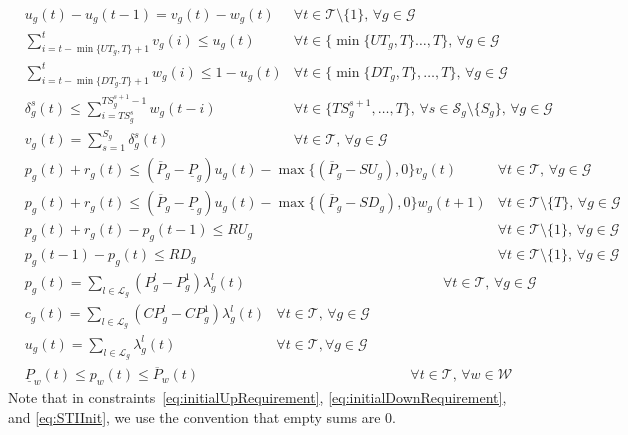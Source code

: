 \documentclass{article}
\newcommand{\cT}{{\mathcal T}}
\newcommand{\cS}{{\mathcal S}}
\newcommand{\cG}{{\mathcal G}}
\newcommand{\cL}{{\mathcal L}}
\newcommand{\cW}{{\mathcal W}}
\newcommand{\uP}{\underline{P}}
\newcommand{\oP}{\overline{P}}
\begin{document}
{\begin{align}
		& u_g(t) - u_g(t-1) = v_g(t) - w_g(t) & \forall t \in \cT\setminus\{1\}, \, \forall g \in \cG \label{eq:Logical} \\
		& \sum_{i= t-\min\{UT_g,T\} + 1}^t v_g(i) \leq u_g(t) & \forall t \in \{\min\{UT_g,T\} \ldots, T\}, \, \forall g \in \cG \label{eq:Startup} \\
		& \sum_{i= t-\min\{DT_g.T\} + 1}^t w_g(i) \leq 1 - u_g(t) & \forall t \in \{\min\{DT_g, T\}, \ldots, T\}, \, \forall g \in \cG \label{eq:Shutdown} \\
		& \delta^s_g(t) \leq \sum_{i = TS^s_g}^{TS^{s+1}_g-1} w_g(t-i) & \forall t \in \{TS^{s+1}_g,\ldots,T\},\,\forall s \in \cS_g\!\setminus\!\{S_g\},\,  \forall g \in \cG \label{eq:STISelect} \\
		& v_g(t) = \sum_{s = 1}^{S_g} \delta^s_g(t) & \forall t \in \cT,\, \forall g \in \cG \label{eq:STILink}
		\end{align}
		\begin{align}
		& p_g(t) + r_g(t) \leq (\oP_g - \uP_g) u_g(t) - \max\{(\oP_g - SU_g),0\} v_g(t) & \forall t \in \cT, \, \forall g \in \cG \label{eq:MaxOutput1} \\
		& p_g(t) + r_g(t) \leq (\oP_g - \uP_g) u_g(t) - \max\{(\oP_g - SD_g),0\} w_g(t+1) & \forall t \in \cT\setminus \{T\}, \, \forall g \in \cG \label{eq:MaxOutput2} \\
		& p_g(t) + r_g(t) - p_g(t-1) \leq RU_g & \forall t \in \cT\setminus\{1\}, \, \forall g \in \cG \label{eq:RampUp} \\
		& p_g(t-1) - p_g(t) \leq RD_g & \forall t \in \cT\setminus\{1\}, \, \forall g \in \cG \label{eq:RampDown}
		\end{align}
		\begin{align}
		& p_g(t) = \sum_{l \in \cL_g} (P_g^l - P_g^1) \lambda_g^l(t) &\hspace{5cm} \forall t \in \cT, \, \forall g \in \cG \label{eq:PiecewiseParts} \\
		& c_g(t) = \sum_{l \in \cL_g} (CP_g^l - CP_g^1) \lambda_g^l(t) & \forall t \in \cT, \, \forall g \in \cG \label{eq:PiecewisePartsCost} \\
		& u_g(t) = \sum_{l \in \cL_g} \lambda_g^l(t) & \forall t \in \cT, \forall g \in \cG \label{eq:PiecewiseLimits}
		\end{align}
		\begin{align}
		& \uP_w(t) \leq p_w(t) \leq \oP_w(t) &\hspace{6cm} \forall t \in \cT, \, \forall w \in \cW \label{eq:WindLimit}
		\end{align}
}%
Note that in constraints~\eqref{eq:initialUpRequirement}, \eqref{eq:initialDownRequirement}, and \eqref{eq:STIInit}, we use the convention that empty sums are $0$.
\end{document}
